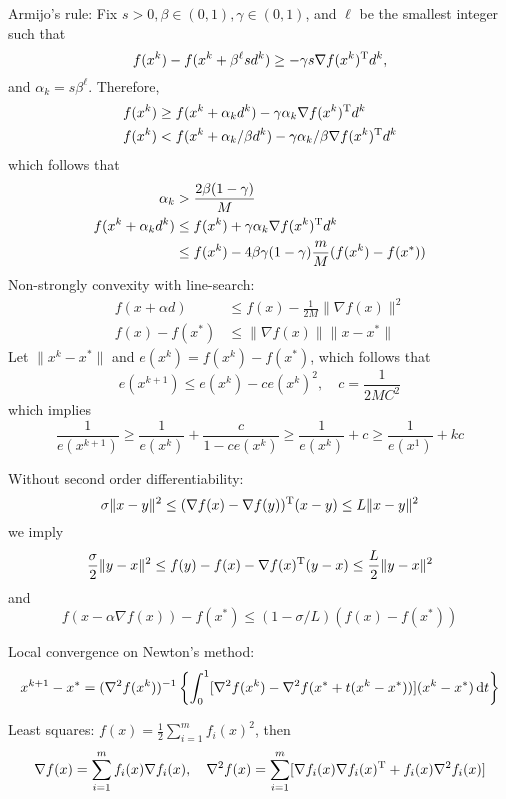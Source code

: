 Armijo's rule:
Fix $s>0,\beta\in(0,1),\gamma\in(0,1)$, and $\ell$ be the smallest integer such that 
\[
f(x^k) - f(x^k+\beta^\ell sd^k)\ge-\gamma s\nabla f(x^k)^{\mathrm T} d^k,
\]
and $\alpha_k=s\beta^\ell$. Therefore,
\begin{align*}
f(x^k)&\ge f(x^k+\alpha_kd^k) - \gamma\alpha_k\nabla f(x^k)^{\mathrm T} d^k\\
f(x^k)&< f(x^k+\alpha_k/\beta d^k) - \gamma\alpha_k/\beta\nabla f(x^k)^{\mathrm T} d^k
\end{align*}
which follows that
\begin{align*}
\alpha_k&>\frac{2\beta(1-\gamma)}{M}\\
f(x^k+\alpha_kd^k)&\le f(x^k)+\gamma\alpha_k\nabla f(x^k)^{\mathrm T} d^k\\
&\le f(x^k)-4\beta\gamma(1-\gamma)\frac{m}{M}(f(x^k) - f(x^*))
\end{align*}
Non-strongly convexity with line-search:
\begin{align*}
f(x+\alpha d)&\le f(x)-\frac{1}{2M}\|\nabla f(x)\|^2\\
f(x) - f(x^*)&\le\|\nabla f(x)\|\|x-x^*\|
\end{align*}
Let $\|x^k - x^*\|$ and $e(x^k) = f(x^k) - f(x^*)$, which follows that
\[
e(x^{k+1})\le e(x^k) - ce(x^k)^2,\quad c = \frac{1}{2MC^2}
\]
which implies
\[
\frac{1}{e(x^{k+1})}\ge\frac{1}{e(x^k)}+\frac{c}{1-ce(x^k)}\ge\frac{1}{e(x^k)}+c\ge\frac{1}{e(x^1)}+kc
\]

Without second order differentiability:
\[
\sigma\|x-y\|^2\le(\nabla f(x) - \nabla f(y))^{\mathrm T}(x-y)\le L\|x-y\|^2
\]
we imply
\[
\frac{\sigma}{2}\|y-x\|^2\le f(y) - f(x) - \nabla f(x)^{\mathrm T} (y-x)\le\frac{L}{2}\|y-x\|^2
\]
and
\[
f(x-\alpha\nabla f(x))-f(x^*)\le (1-\sigma/L)(f(x) - f(x^*))
\]

Local convergence on Newton's method:
\[
x^{k+1} - x^*
=
(\nabla^2f(x^k))^{-1}\left\{
\int_0^1[\nabla^2f(x^k) - \nabla^2f(x^* +t(x^k - x^*))](x^k-x^*)\,\mathrm{d} t
\right\}
\]

Least squares: $f(x) = \frac{1}{2}\sum_{i=1}^mf_i(x)^2$, then
\[
\nabla f(x) = \sum_{i=1}^mf_i(x)\nabla f_i(x),\quad
\nabla^2f(x) = \sum_{i=1}^m[\nabla f_i(x)\nabla f_i(x)^{\mathrm T} + f_i(x)\nabla^2f_i(x)]
\]


